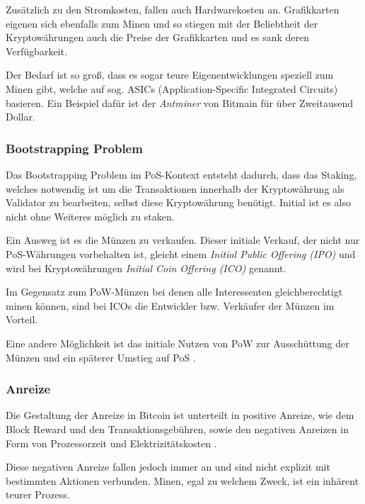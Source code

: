 Zusätzlich zu den Stromkosten, fallen auch Hardwarekosten an.
Grafikkarten eigenen sich ebenfalls zum Minen und so stiegen mit der Beliebtheit der Kryptowährungen auch die Preise der Grafikkarten und es sank deren Verfügbarkeit. 

Der Bedarf ist so groß, dass es sogar teure Eigenentwicklungen speziell zum Minen gibt, welche auf sog. ASICs (Application-Specific Integrated Circuits) basieren. 
Ein Beispiel dafür ist der \textit{Antminer\footnotemark} von Bitmain für über Zweitausend Dollar.


\subsubsection{Bootstrapping Problem}
\label{subsec:bootstrapping}

Das Bootstrapping Problem im PoS-Kontext entsteht dadurch, dass das Staking, welches notwendig ist um die Transaktionen innerhalb der Kryptowährung als Validator zu bearbeiten, selbst diese Kryptowährung benötigt.
Initial ist es also nicht ohne Weiteres möglich zu staken.

Ein Ausweg ist es die Münzen zu verkaufen. Dieser initiale Verkauf, der nicht nur PoS-Währungen vorbehalten ist, gleicht einem \textit{Initial Public Offering (IPO)} und wird bei Kryptowährungen \textit{Initial Coin Offering (ICO)} genannt. 

Im Gegensatz zum PoW-Münzen bei denen alle Interessenten gleichberechtigt minen können, sind bei ICOs die Entwickler bzw. Verkäufer der Münzen im  Vorteil.

Eine andere Möglichkeit ist das initiale Nutzen von PoW zur Ausschüttung der Münzen und ein späterer Umstieg auf PoS \cite[S. 12f.]{cwo_pow}.

\subsubsection{Anreize}
\label{subsec:incentives}

Die Gestaltung der Anreize in Bitcoin ist unterteilt in positive Anreize, wie dem Block Reward und den Transaktionsgebühren, sowie den negativen Anreizen in Form von Prozessorzeit und Elektrizitätskosten \cite[S. 4]{bitcoin}.

Diese negativen Anreize fallen jedoch immer an und sind nicht explizit mit bestimmten Aktionen verbunden. Minen, egal zu welchem Zweck, ist ein inhärent teurer Prozess. 

